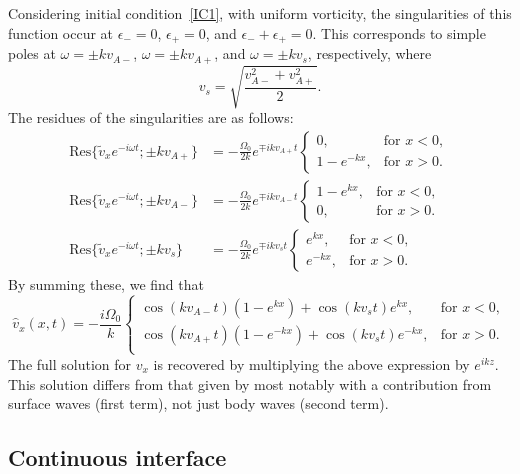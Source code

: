 \documentclass[12pt]{../style-files/ociamthesis}
\begin{document}
Considering initial condition~\ref{IC1}, with uniform vorticity, the singularities of this function occur at $\epsilon_- = 0$, $\epsilon_+ = 0$, and $\epsilon_- + \epsilon_+ = 0$. This corresponds to simple poles at $\omega = \pm kv_{A-}$, $\omega = \pm kv_{A+}$, and $\omega = \pm kv_s$, respectively, where
\begin{equation}
v_s = \sqrt{\frac{v_{A-}^2 + v_{A+}^2}{2}}.
\end{equation}
The residues of the singularities are as follows:
\begin{align}
\mathrm{Res}\{\tilde{v}_x e^{-i\omega t}; \pm kv_{A+}\} &= -\frac{\Omega_0}{2k} e^{\mp ikv_{A+}t}
\begin{cases}
0, & \text{for  } x<0, \\
1 - e^{-kx}, & \text{for  } x>0.
\end{cases} \\
\mathrm{Res}\{\tilde{v}_x e^{-i\omega t}; \pm kv_{A-}\} &= -\frac{\Omega_0}{2k} e^{\mp ikv_{A-}t}
\begin{cases}
1 - e^{kx}, & \text{for  } x<0, \\
0, & \text{for  } x>0.
\end{cases} \\
\mathrm{Res}\{\tilde{v}_x e^{-i\omega t}; \pm kv_{s}\} &= -\frac{\Omega_0}{2k} e^{\mp ikv_st} 
\begin{cases}
e^{kx}, & \text{for  } x<0, \\
e^{-kx}, & \text{for  } x>0.
\end{cases}
\end{align}
By summing these, we find that
\begin{equation}
\hat{v}_x(x, t) = -\frac{i\Omega_0}{k} \begin{cases}
\cos(kv_{A-}t)(1-e^{kx}) + \cos(kv_st)e^{kx}, & \text{for  } x<0, \\
\cos(kv_{A+}t)(1-e^{-kx}) + \cos(kv_st)e^{-kx}, & \text{for  } x>0. \\
\end{cases}
\end{equation}
The full solution for $v_x$ is recovered by multiplying the above expression by $e^{ikz}$. This solution differs from that given by \cite{rae_etal81} most notably with a contribution from surface waves (first term), not just body waves (second term).


\color{red}
\subsection{Continuous interface}
\end{document}
